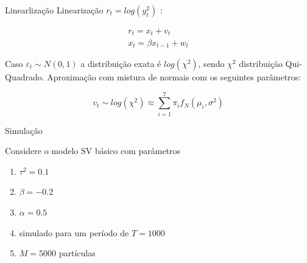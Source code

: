 \documentclass{beamer}
\begin{document}
\begin{frame}{Linearlização}
Linearização  $r_t = log(y_t^2)$  \citep{Kim1998}:


\begin{eqnarray}
r_t = x_t + v_t  \nonumber \\
x_t = \beta x_{t-1} + w_t
\label{eq:svm_basico}
\end{eqnarray}


Caso $\varepsilon_t \sim N(0,1)$ a distribuição exata é $log(\chi^2)$, sendo $\chi^2$ distribuição Qui-Quadrado. Aproximação com mistura de normais com os seguintes parâmetros:

\begin{equation}
v_t \sim log(\chi^2) \approx \sum_{i=1}^7 \pi_i f_N(\mu_i,\sigma^2)
\label{eq:mixnormal}
\end{equation}

\end{frame}



%
%


\begin{frame}{Simulação}

Considere o modelo SV básico com parâmetros 
\begin{enumerate}
\item $\tau^2=0.1$
\item $\beta=-0.2$ 
\item $\alpha=0.5$ 
\item simulado para um período de $T=1000$
\item $M=5000$ partículas
\end{enumerate}


\end{frame}
\end{document}
